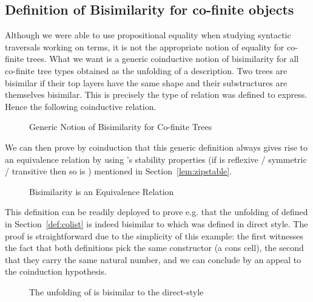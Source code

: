 \subsection{Definition of Bisimilarity for co-finite objects}

Although we were able to use propositional equality when studying
syntactic traversals working on terms, it is not the appropriate
notion of equality for co-finite trees. What we want is a generic
coinductive notion of bisimilarity for all co-finite tree types
obtained as the unfolding of a description. Two trees are bisimilar
if their top layers have the same shape and their substructures are
themselves bisimilar. This is precisely the type of relation 
was defined to express. Hence the following coinductive relation.

\begin{figure}[h]
\caption{Generic Notion of Bisimilarity for Co-finite Trees}
\end{figure}

We can then prove by coinduction that this generic definition always gives
rise to an equivalence relation by using 's stability properties
(if  is reflexive / symmetric / transitive then so is {  })
mentioned in Section~\ref{lem:zipstable}.

\begin{figure}[h]
\caption{Bisimilarity is an Equivalence Relation}
\end{figure}

This definition can be readily deployed to prove e.g. that the unfolding
of  defined in Section~\ref{def:colist} is indeed bisimilar to 
which was defined in direct style. The proof is straightforward due to the simplicity
of this example: the first  witnesses the fact that both definitions
pick the same constructor (a cons cell), the second that they carry the
same natural number, and we can conclude by an appeal to the coinduction
hypothesis.

\begin{figure}[h]
\caption{The unfolding of  is bisimilar to the direct-style }
\end{figure}



